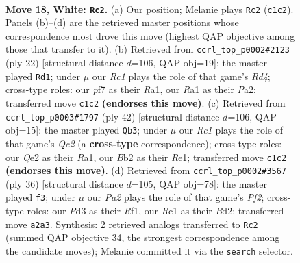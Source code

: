 \documentclass[11pt]{article}
\begin{document}
\clearpage

\begin{figure}[p]\centering
\begin{subfigure}{0.46\textwidth}\centering
\resizebox{\linewidth}{!}{%
\newchessgame
\chessboard[
  setfen={2rq1rk1/4bp2/2n2np1/p6p/1p1p4/1P1P1NP1/PB2QPKP/RNR5 w - - 4 18},
  showmover=false,
  pgfstyle=straightmove, color=movearrow, markmove={c1-c2}
]}
\caption{}
\end{subfigure}\hfill
\begin{subfigure}{0.46\textwidth}\centering
\resizebox{\linewidth}{!}{%
\newchessgame
\chessboard[
  setfen={r2q1rk1/pb1p1ppp/1pn1pn2/8/2PR4/5NP1/PPQ1PPBP/RN4K1 w - - 1 12},
  showmover=false,
  pgfstyle=straightmove, color=movearrow, markmove={d4-d1}
]}
\caption{}
\end{subfigure}
\\[4pt]
\begin{subfigure}{0.46\textwidth}\centering
\resizebox{\linewidth}{!}{%
\newchessgame
\chessboard[
  setfen={1r2r1k1/ppp2nbp/5n2/PP2pb1q/2P3p1/2N3P1/1BQN1PBP/R3R1K1 w - - 0 22},
  showmover=false,
  pgfstyle=straightmove, color=movearrow, markmove={c2-b3}
]}
\caption{}
\end{subfigure}\hfill
\begin{subfigure}{0.46\textwidth}\centering
\resizebox{\linewidth}{!}{%
\newchessgame
\chessboard[
  setfen={r1q1nrk1/2pbn1b1/1p1p3p/3Ppp2/P1P4N/R1NB2P1/2QB1P1P/5RK1 w - - 1 19},
  showmover=false,
  pgfstyle=straightmove, color=movearrow, markmove={f2-f3}
]}
\caption{}
\end{subfigure}
\caption{\textbf{Move 18, White: \texttt{Rc2}.} (a) Our position; Melanie plays \texttt{Rc2} (\texttt{c1c2}). Panels (b)--(d) are the retrieved master positions whose correspondence most drove this move (highest QAP objective among those that transfer to it). (b) Retrieved from \texttt{ccrl\_top\_p0002\#2123} (ply 22) [structural distance $d$=106, QAP obj=19]: the master played \texttt{Rd1}; under $\mu$ our \emph{Rc1} plays the role of that game's \emph{Rd4}; cross-type roles: our \emph{p}f7 as their \emph{R}a1, our \emph{R}a1 as their \emph{P}a2; transferred move \texttt{c1c2} \textbf{(endorses this move)}. (c) Retrieved from \texttt{ccrl\_top\_p0003\#1797} (ply 42) [structural distance $d$=106, QAP obj=15]: the master played \texttt{Qb3}; under $\mu$ our \emph{Rc1} plays the role of that game's \emph{Qc2} (a \textbf{cross-type} correspondence); cross-type roles: our \emph{Q}e2 as their \emph{R}a1, our \emph{B}b2 as their \emph{R}e1; transferred move \texttt{c1c2} \textbf{(endorses this move)}. (d) Retrieved from \texttt{ccrl\_top\_p0002\#3567} (ply 36) [structural distance $d$=105, QAP obj=78]: the master played \texttt{f3}; under $\mu$ our \emph{Pa2} plays the role of that game's \emph{Pf2}; cross-type roles: our \emph{P}d3 as their \emph{R}f1, our \emph{R}c1 as their \emph{B}d2; transferred move \texttt{a2a3}. Synthesis: 2 retrieved analogs transferred to \texttt{Rc2} (summed QAP objective 34, the strongest correspondence among the candidate moves); Melanie committed it via the \texttt{search} selector.}
\label{fig:thought-m34}
\end{figure}
\end{document}
